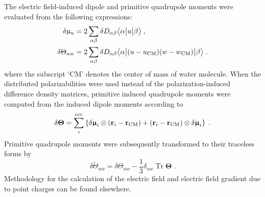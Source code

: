 \documentclass[aip,amsmath,amssymb,reprint,floatfix]{revtex4-1}
\newcommand{\tbraket}[3]{\ensuremath{\bigl\langle {#1} \bigl\lvert {#2} \bigl\lvert {#3} \bigr\rangle}}
\newcommand{\BM}[1]{\bm{#1}}
\DeclareMathOperator{\Tr}{Tr}
\begin{document}
The electric field\hyp{}induced dipole and primitive quadrupole moments were evaluated from the following expressions:
%
\begin{subequations}\label{e:dmult}
  \begin{align}
   \delta \upmu_{u}   &= 2\sum_{\alpha\beta} \delta D_{\alpha\beta} \tbraket{\alpha}{u}{\beta}  \;,\\
   \delta \Theta_{uw} &= 2\sum_{\alpha\beta} \delta D_{\alpha\beta} \tbraket{\alpha}{(u-u_{\rm CM})(w-w_{\rm CM})}{\beta} \;. 
  \end{align}
\end{subequations}
%
where the subscript `CM' denotes the center of mass of water molecule.
When the distributed polarizabilities were used instead of the polarization\hyp{}induced 
difference density matrices, primitive induced quadrupole moments were computed from
the induced dipole moments according to
%
\begin{equation}
  \delta {\BM \Theta} = \sum_i^{\rm occ} 
   \left\{ 
       \delta {\BM \upmu}_i \otimes \left( {\bf r}_i - {\bf r}_{\rm CM} \right) 
      + \left( {\bf r}_i - {\bf r}_{\rm CM} \right) \otimes \delta {\BM \upmu}_i
   \right\} \;.
\end{equation}
%
Primitive quadrupole moments were subsequently transformed to their traceless forms by
%
\begin{equation}
  \delta \widetilde{\Theta}_{uw} = \delta \Theta_{uw} - \frac{1}{3} \delta_{uw} \Tr{\BM\Theta} \;.
\end{equation}
%
Methodology for the calculation of the electric field and electric field gradient due to point charges
can be found elsewhere.\cite{Blasiak.Cho.JCP.2014}
\end{document}
